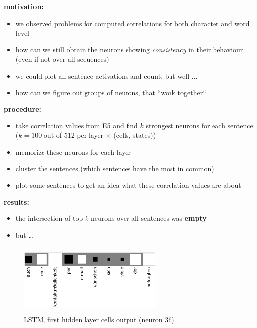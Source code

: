 \begin{frame}{\expvi}
	\textbf{motivation:}
	\begin{itemize}
		\item we observed problems for computed correlations for both character and word level
		\item how can we still obtain the neurons showing \textit{consistency} in their behaviour (even if not over all sequences)
		\item we could plot all sentence activations and count, but well ...
		\item how can we figure out groups of neurons, that “work together“
	\end{itemize}
\end{frame}
\begin{frame}{\expvi}
	\textbf{procedure:}
	\begin{itemize}
		\item take correlation values from E5 and find $k$ strongest neurons for each sentence ($k=100$ out of 512 per layer $\times$ (cells, states))
		\item memorize these neurons for each layer
		\item cluster the sentences (which sentences have the most in common)
		\item plot some sentences to get an idea what these correlation values are about 
	\end{itemize}
\end{frame}
\begin{frame}{\expvi}
	\textbf{results:}
	\begin{itemize}
		\item the intersection of top $k$ neurons over all sentences was \textbf{empty}
		\item but \dots
	\end{itemize}
\end{frame}
\begin{frame}{\expvi}
	\begin{figure}
		\includegraphics[width=200pt,height=100pt]{gfx/perfectneuron.png}
		\caption{LSTM, first hidden layer cells output (neuron 36)} %
	\end{figure}
\end{frame}
